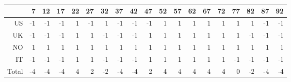 \begin{tabular}{rrrrrrrrrrrrrrrrrrr}
  \hline
 & 7 & 12 & 17 & 22 & 27 & 32 & 37 & 42 & 47 & 52 & 57 & 62 & 67 & 72 & 77 & 82 & 87 & 92 \\ 
  \hline
US & -1 & -1 & -1 & 1 & -1 & 1 & -1 & -1 & -1 & 1 & 1 & 1 & 1 & 1 & 1 & 1 & -1 & -1 \\ 
  UK & -1 & -1 & -1 & 1 & 1 & -1 & -1 & -1 & 1 & 1 & 1 & 1 & 1 & 1 & 1 & -1 & -1 & -1 \\ 
  NO & -1 & -1 & -1 & 1 & 1 & -1 & -1 & -1 & 1 & 1 & 1 & 1 & 1 & 1 & -1 & -1 & -1 & -1 \\ 
  IT & -1 & -1 & -1 & 1 & 1 & -1 & -1 & -1 & 1 & 1 & 1 & 1 & 1 & 1 & -1 & -1 & -1 & -1 \\ 
  \hline
  Total & -4 & -4 & -4 & 4 & 2 & -2 & -4 & -4 & 2 & 4 & 4 & 4 & 4 & 4 & 0 & -2 & -4 & -4 \\ 
   \hline
\end{tabular}

